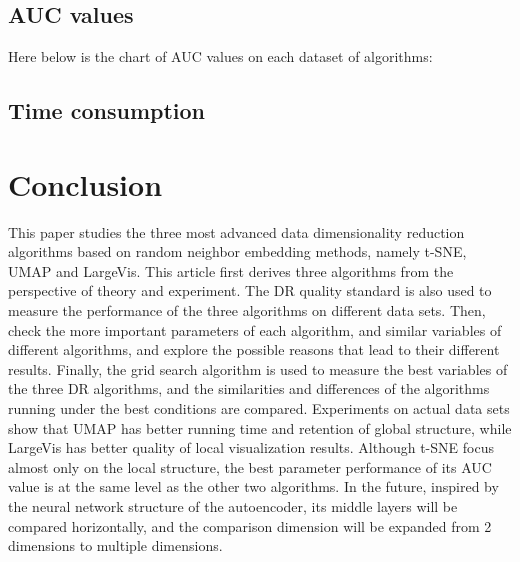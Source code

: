 \section{AUC values}

Here below is the chart of AUC values on each dataset of algorithms:


\section{Time consumption}


\chapter{Conclusion}

This paper studies the three most advanced data dimensionality reduction algorithms based on random neighbor embedding methods, namely t-SNE, UMAP and LargeVis. This article first derives three algorithms from the perspective of theory and experiment. The DR quality standard is also used to measure the performance of the three algorithms on different data sets. Then, check the more important parameters of each algorithm, and similar variables of different algorithms, and explore the possible reasons that lead to their different results. Finally, the grid search algorithm is used to measure the best variables of the three DR algorithms, and the similarities and differences of the algorithms running under the best conditions are compared. Experiments on actual data sets show that UMAP has better running time and retention of global structure, while LargeVis has better quality of local visualization results. Although t-SNE focus almost only on the local structure, the best parameter performance of its AUC value is at the same level as the other two algorithms. In the future, inspired by the neural network structure of the autoencoder, its middle layers will be compared horizontally, and the comparison dimension will be expanded from 2 dimensions to multiple dimensions.




